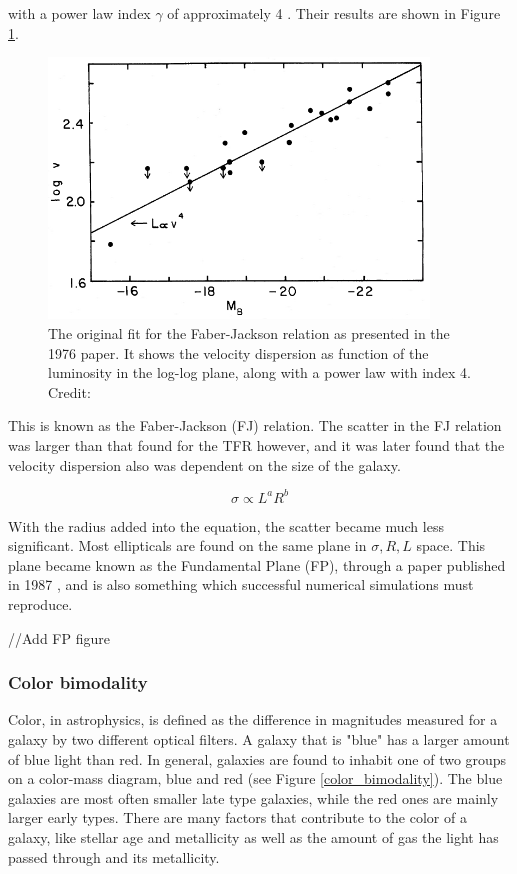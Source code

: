 with a power law index $\gamma$ of approximately 4 \parencite{FaberJackson1976}. Their results are shown in Figure \ref{faber_jackson}.

\begin{figure}
    \centering
    \includegraphics[width=0.9\textwidth]{images/faber_jackson.png}
    \caption{The original fit for the Faber-Jackson relation as presented in the 1976 paper. It shows the velocity dispersion as function of the luminosity in the log-log plane, along with a power law with index 4. Credit: \cite{FaberJackson1976}}
    \label{faber_jackson}
\end{figure}

This is known as the Faber-Jackson (FJ) relation. The scatter in the FJ relation was larger than that found for the TFR however, and it was later found that the velocity dispersion also was dependent on the size of the galaxy.

\begin{equation}
    \sigma \propto L^a R^b
\end{equation}

With the radius added into the equation, the scatter became much less significant. Most ellipticals are found on the same plane in ${\sigma, R, L}$ space. This plane became known as the Fundamental Plane (FP), through a paper published in 1987 \parencite{Djorgovski1987}, and is also something which successful numerical simulations must reproduce.

//Add FP figure

\subsubsection{Color bimodality}
Color, in astrophysics, is defined as the difference in magnitudes measured for a galaxy by two different optical filters. A galaxy that is "blue" has a larger amount of blue light than red. In general, galaxies are found to inhabit one of two groups on a color-mass diagram, blue and red (see Figure \ref{color_bimodality}). The blue galaxies are most often smaller late type galaxies, while the red ones are mainly larger early types. There are many factors that contribute to the color of a galaxy, like stellar age and metallicity as well as the amount of gas the light has passed through and its metallicity.


